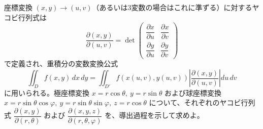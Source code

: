 
座標変換 $(x,y) \to (u,v)$（あるいは3変数の場合はこれに準ずる）に対するヤコビ行列式は
\[
\frac{\partial(x,y)}{\partial(u,v)} = \det \begin{pmatrix} \dfrac{\partial x}{\partial u} & \dfrac{\partial x}{\partial v} \\[2mm] \dfrac{\partial y}{\partial u} & \dfrac{\partial y}{\partial v} \end{pmatrix}
\]
で定義され、重積分の変数変換公式
\[
\iint_{D} f(x,y)\, dx\, dy = \iint_{D'} f(x(u,v), y(u,v)) \left| \frac{\partial(x,y)}{\partial(u,v)} \right| du\, dv
\]
に用いられる。極座標変換 $x = r\cos\theta,\ y = r\sin\theta$ および球座標変換 $x = r\sin\theta\cos\varphi,\ y = r\sin\theta\sin\varphi,\ z = r\cos\theta$ について、それぞれのヤコビ行列式
$\dfrac{\partial(x,y)}{\partial(r,\theta)}$ および $\dfrac{\partial(x,y,z)}{\partial(r,\theta,\varphi)}$
を、導出過程を示して求めよ。
